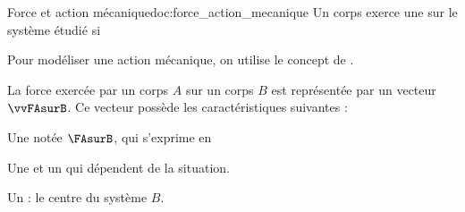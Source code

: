 \begin{doc}{Force et action mécanique}{doc:force_action_mecanique}
  \chevron Un corps exerce une  sur le système étudié si \reponseLigne
  
  Pour modéliser une action mécanique, on utilise le concept de .
  
  \begin{encart}
    La force exercée par un corps $A$ sur un corps $B$ est représentée par un vecteur $\vvFAsurB$.
    Ce vecteur possède les caractéristiques suivantes :
    \begin{listePoints}
      \item Une  notée $\FAsurB$, qui s'exprime en \dotfill
      \item Une  et un  qui dépendent de la situation.
      \item Un  : le centre du système $B$.
    \end{listePoints}
  \end{encart}
\end{doc}

